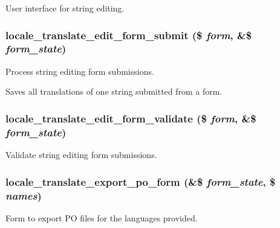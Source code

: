 User interface for string editing. \hypertarget{group__locale_gdbeab4019dcbf389a12af893cdaad5d5}{
\subsubsection[{locale\_\-translate\_\-edit\_\-form\_\-submit}]{\setlength{\rightskip}{0pt plus 5cm}locale\_\-translate\_\-edit\_\-form\_\-submit (\$ {\em form}, \/  \&\$ {\em form\_\-state})}}
\label{group__locale_gdbeab4019dcbf389a12af893cdaad5d5}


Process string editing form submissions.

Saves all translations of one string submitted from a form. \hypertarget{group__locale_g93fc48be446148e648c9a1d0f630726e}{
\subsubsection[{locale\_\-translate\_\-edit\_\-form\_\-validate}]{\setlength{\rightskip}{0pt plus 5cm}locale\_\-translate\_\-edit\_\-form\_\-validate (\$ {\em form}, \/  \&\$ {\em form\_\-state})}}
\label{group__locale_g93fc48be446148e648c9a1d0f630726e}


Validate string editing form submissions. \hypertarget{group__locale_g8383d501e09c3b58fa391ce7a709a8e3}{
\subsubsection[{locale\_\-translate\_\-export\_\-po\_\-form}]{\setlength{\rightskip}{0pt plus 5cm}locale\_\-translate\_\-export\_\-po\_\-form (\&\$ {\em form\_\-state}, \/  \$ {\em names})}}
\label{group__locale_g8383d501e09c3b58fa391ce7a709a8e3}


Form to export PO files for the languages provided.

